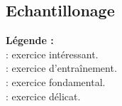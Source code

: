 \subsection{Echantillonage}








{\noindent
{\bf L\'egende :}\\

\noindent \coolexo : exercice int\'eressant.\\
\boringexo : exercice d'entra\^inement.\\
\minsyndical : exercice fondamental.\\
\mortelexo : exercice d\'elicat.}
